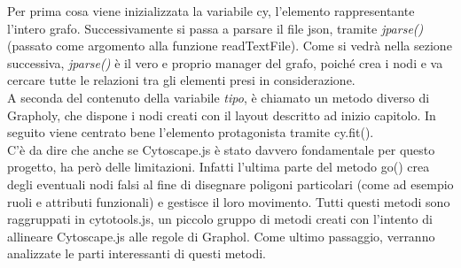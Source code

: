 \documentclass[Lau,binding=0.6cm]{sapthesis}
\begin{document}
Per prima cosa viene inizializzata la variabile cy, l'elemento rappresentante l'intero grafo. Successivamente si passa a parsare il file json, tramite \textit{jparse()} (passato come argomento alla funzione readTextFile). Come si vedrà nella sezione successiva, \textit{jparse()} è il vero e proprio manager del grafo, poiché crea i nodi e va cercare tutte le relazioni tra gli elementi presi in considerazione. 
\\A seconda del contenuto della variabile \textit{tipo}, è chiamato un metodo diverso di Grapholy, che dispone i nodi creati con il layout descritto ad inizio capitolo. In seguito viene centrato bene l'elemento protagonista tramite cy.fit().\\
C'è da dire che anche se Cytoscape.js è stato davvero fondamentale per questo progetto, ha però delle limitazioni. Infatti l'ultima parte del metodo go() crea degli eventuali nodi falsi al fine di disegnare poligoni particolari (come ad esempio ruoli e attributi funzionali) e gestisce il loro movimento. Tutti questi metodi sono raggruppati in cytotools.js, un piccolo gruppo di metodi creati con l'intento di allineare Cytoscape.js alle regole di Graphol. Come ultimo passaggio, verranno analizzate le parti interessanti di questi metodi.
\end{document}

